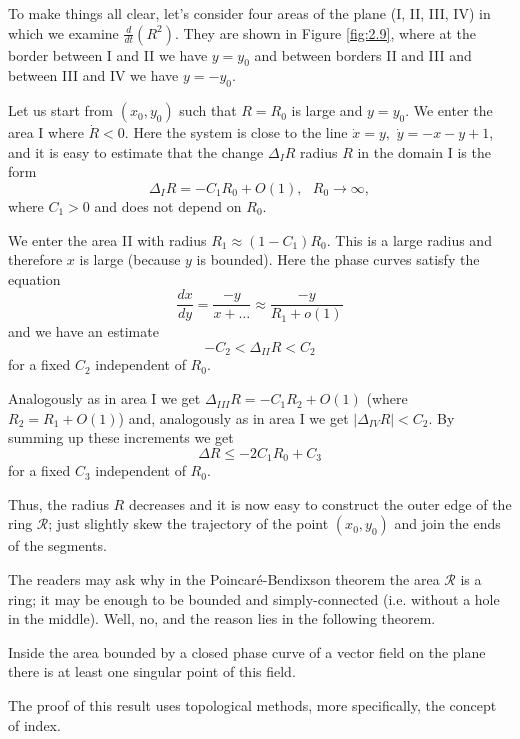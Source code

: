 \begin{example}
	To make things all clear, let's consider four areas of the plane (I, II, III, IV) in which we examine $ \frac {d} {dt} \left (R ^ {2} \right) $. They are shown in Figure \ref{fig:2.9}, where at the border between I and II we have $y=y_{0}$ and between borders II and III and between III and IV we have $y=-y_{0}$.
	
	Let us start from $ \left (x_ {0}, y_ {0} \right) $ such that $ R = R_ {0} $ is large and $ y = y_{0} $. We enter the area I where $ \dot {R} <0 $. Here the system is close to the line $ \dot {x} = y, $ $ \dot {y} = - x-y + 1 $, and it is easy to estimate that the change $ \Delta _ {I} R $ radius $ R $ in the domain I is the form
	$$
	\Delta _{I}R=-C_{1}R_{0}+O(1),\text{ \ \ }R_{0}\rightarrow \infty ,
	$$
	where $C_{1}>0$ and does not depend on $R_{0}$.
	
	We enter the area II with radius $ R_ {1} \approx (1-C_ {1}) R_ {0}$. This is a large radius and therefore $ x $ is large (because $ y $ is bounded). Here the phase curves satisfy the equation
	$$
	\frac{dx}{dy}=\frac{-y}{x+\ldots }\approx \frac{-y}{R_{1}+o(1)}
	$$
	and we have an estimate
	$$
	-C_{2}<\Delta _{II}R<C_{2}
	$$
	for a fixed $ C_ {2} $ independent of $ R_ {0}. $
	
	Analogously as in area I we get $\Delta _{III}R=-C_{1}R_{2}+O(1)$
	(where $R_{2}=R_{1}+O(1)$) and, analogously as in area I we get $\left\vert \Delta _{IV}R\right\vert <C_{2}$. By summing up these increments we get
	$$
	\Delta R\leq -2C_{1}R_{0}+C_{3}
	$$
	for a fixed $ C_ {3} $ independent of $ R_ {0}$.
	
	Thus, the radius $ R $ decreases and it is now easy to construct the outer edge of the ring $ \mathcal {R} $; just slightly skew the trajectory of the point $(x_0, y_0)$ and join the ends of the segments.
\end{example}

The readers may ask why in the Poincaré-Bendixson theorem the area $ \mathcal {R} $ is a ring; it may be enough to be bounded and simply-connected (i.e. without a hole in the middle). Well, no, and the reason lies in the following theorem.

\begin{theorem}\label{theo:2.21}
	Inside the area bounded by a closed phase curve of a vector field on the plane there is at least one singular point of this field.
\end{theorem}

The proof of this result uses topological methods, more specifically, the concept of index.

